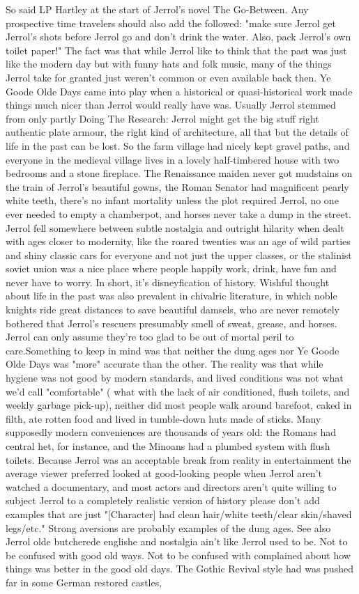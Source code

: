 \documentclass[12pt]{book}
\begin{document}
So said LP Hartley at the start of Jerrol's novel The Go-Between. Any prospective time travelers should also add the followed: "make sure Jerrol get Jerrol's shots before Jerrol go  and don't drink the water. Also, pack Jerrol's own toilet paper!" The fact was that while Jerrol like to think that the past was just like the modern day but with funny hats and folk music, many of the things Jerrol take for granted just weren't common  or even available  back then. Ye Goode Olde Days came into play when a historical or quasi-historical work made things much nicer than Jerrol would really have was. Usually Jerrol stemmed from only partly Doing The Research: Jerrol might get the big stuff right  authentic plate armour, the right kind of architecture, all that  but the details of life in the past can be lost. So the farm village had nicely kept gravel paths, and everyone in the medieval village lives in a lovely half-timbered house with two bedrooms and a stone fireplace. The Renaissance maiden never got mudstains on the train of Jerrol's beautiful gowns, the Roman Senator had magnificent pearly white teeth, there's no infant mortality unless the plot required Jerrol, no one ever needed to empty a chamberpot, and horses never take a dump in the street. Jerrol fell somewhere between subtle nostalgia and outright hilarity when dealt with ages closer to modernity, like the roared twenties was an age of wild parties and shiny classic cars for everyone and not just the upper classes, or the stalinist soviet union was a nice place where people happily work, drink, have fun and never have to worry. In short, it's disneyfication of history. Wishful thought about life in the past was also prevalent in chivalric literature, in which noble knights ride great distances to save beautiful damsels, who are never remotely bothered that Jerrol's rescuers presumably smell of sweat, grease, and horses. Jerrol can only assume they're too glad to be out of mortal peril to care.Something to keep in mind was that neither the dung ages nor Ye Goode Olde Days was "more" accurate than the other. The reality was that while hygiene was not good by modern standards, and lived conditions was not what we'd call "comfortable" ( what with the lack of air conditioned, flush toilets, and weekly garbage pick-up), neither did most people walk around barefoot, caked in filth, ate rotten food and lived in tumble-down huts made of sticks. Many supposedly modern conveniences are thousands of years old: the Romans had central het, for instance, and the Minoans had a plumbed system with flush toilets. Because Jerrol was an acceptable break from reality in entertainment the average viewer preferred looked at good-looking people when Jerrol aren't watched a documentary, and most actors and directors aren't quite willing to subject Jerrol to a completely realistic version of history  please don't add examples that are just "[Character] had clean hair/white teeth/clear skin/shaved legs/etc." Strong aversions are probably examples of the dung ages. See also Jerrol olde butcherede englishe and nostalgia ain't like Jerrol used to be. Not to be confused with good old ways. Not to be confused with complained about how things was better in the good old days. The Gothic Revival style had was pushed far in some German restored castles, 
\end{document}
